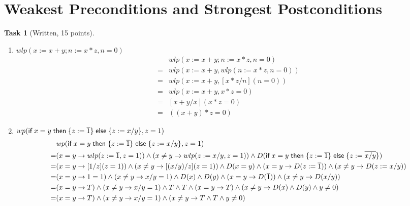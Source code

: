 \documentclass{article}
\newcommand{\stmt}[1]{\text{\sffamily #1}}
\newcommand{\ifs}[3]{\stmt{if}\;#1\;\stmt{then}\;\{#2\}\;\stmt{else}\;\{#3\}}
\theoremstyle{task}
\newtheorem{task}{Task}[section]
\begin{document}
\section{Weakest Preconditions and Strongest Postconditions}

\begin{task}[Written, 15 points]\
    \begin{enumerate}
        \item $wlp(x := x + y; n := x * z, n = 0)$
            \begin{align*}
                &wlp(x := x + y; n := x * z, n = 0) \\
                =& wlp(x := x + y, wlp(n := x * z, n = 0)) \\
                =& wlp(x := x + y, [x * z/n](n = 0)) \\
                =& wlp(x := x + y, x * z = 0) \\
                =& [x + y/x](x * z = 0) \\
                =& ((x + y) * z = 0)
            \end{align*}
        \item $wp(\ifs{x = y}{z := \overline{1}}{z := x/y}, z = 1)$
            \begin{align*}
                &wp(\ifs{x = y}{z := \overline{1}}{z := x/y}, z = 1) \\
                =& (x = y \rightarrow wlp(z := \overline{1}, z = 1)) \wedge
                (x \neq y \rightarrow wlp(z := x/y, z = 1)) \wedge
                D(\ifs{x = y}{z := \overline{1}}{z := \overline{x/y}})\\
                =& (x = y \rightarrow [1/z](z = 1)) \wedge
                (x \neq y \rightarrow [(x/y)/z](z = 1)) \wedge
                D(x = y) \wedge (x = y \rightarrow D(z := \overline{1})) \wedge (x \neq y \rightarrow D(z := x/y)) \\
                =& (x = y \rightarrow 1 = 1) \wedge (x \neq y \rightarrow x/y = 1) \wedge
                D(x) \wedge D(y) \wedge (x = y \rightarrow D(\overline{1})) \wedge
                (x \neq y \rightarrow D(x/y)) \\
                =& (x = y \rightarrow T) \wedge (x \neq y \rightarrow x/y = 1) \wedge
                T \wedge T \wedge (x = y \rightarrow T) \wedge (x \neq y \rightarrow D(x) \wedge D(y) \wedge y \neq 0) \\
                =& (x = y \rightarrow T) \wedge (x \neq y \rightarrow x/y = 1) \wedge
                (x \neq y \rightarrow T \wedge T \wedge y \neq 0) \\

\end{align*}
\end{enumerate}
\end{task}
\end{document}
